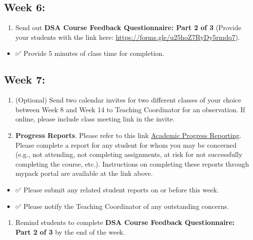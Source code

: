 \documentclass[
]{book}
\providecommand{\tightlist}{%
  \setlength{\itemsep}{0pt}\setlength{\parskip}{0pt}}
\begin{document}
\subsection{Week 6:}\label{week-6}

\begin{enumerate}
\def\labelenumi{\arabic{enumi})}
\tightlist
\item
  Send out { \textbf{DSA Course Feedback Questionnaire: Part 2 of 3} } (Provide your students with the link here: \url{https://forms.gle/u25hoZ7RyDy5rmdq7}).
\end{enumerate}

\begin{itemize}
\tightlist
\item
  ✅ Provide 5 minutes of class time for completion.
\end{itemize}

\subsection{Week 7:}\label{week-7}

\begin{enumerate}
\def\labelenumi{\arabic{enumi})}
\item
  (Optional) Send two calendar invites for two different classes of your choice between Week 8 and Week 14 to Teaching Coordinator for an observation. If online, please include class meeting link in the invite.
\item
  \textbf{Progress Reports}. Please refer to this link \href{https://dasa.ncsu.edu/faculty-resources/academic-progress-reporting/}{Academic Progress Reporting}. Please complete a report for any student for whom you may be concerned (e.g., not attending, not completing assignments, at risk for not successfully completing the course, etc.). Instructions on completing these reports through mypack portal are available at the link above.
\end{enumerate}

\begin{itemize}
\item
  ✅ Please submit any related student reports on or before this week.
\item
  ✅ Please notify the Teaching Coordinator of any outstanding concerns.
\end{itemize}

\begin{enumerate}
\def\labelenumi{\arabic{enumi})}
\setcounter{enumi}{2}
\tightlist
\item
  Remind students to complete \textbf{DSA Course Feedback Questionnaire: Part 2 of 3} by the end of the week.
\end{enumerate}
\end{document}
